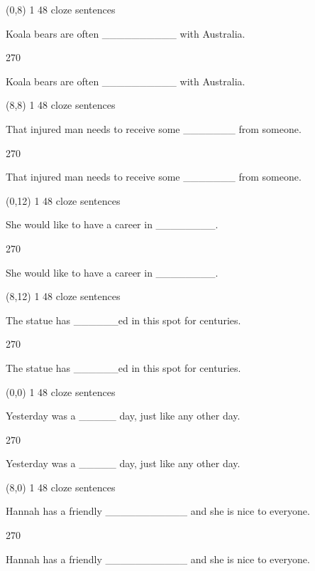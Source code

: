 \documentclass[a4paper]{article}
\newenvironment{itemize*}%
{\begin{itemize}%
 \setlength{\itemsep}{0.5cm}%
 \setlength{\parsep}{0pt}%
 \setlength{\parskip}{0pt}}%
{\end{itemize}}
\newcommand{\mycard}[3]{%
	\small #1 #2
	\par
	\parbox[t][6.8cm][c]{9.5cm}{%
	\par
	\myleft{#3}
	\par
	\myright{#3}
	}
}
\newcommand{\myleft}[1]{%
	\begin{sideways}
	\hspace*{-0.9cm}
		\parbox[t][2.7cm][t]{6.5cm}{%
		\large #1
		}
	\end{sideways}
}
\newcommand{\myright}[1]{%
	\hspace*{6.5cm}
	\begin{turn}{270}
	\hspace*{-7.1cm}
		\parbox[t][2.7cm][t]{6.5cm}{%
		\large #1
		}
	\end{turn}
}
\begin{document}
\begin{textblock}{8}(0,8)
\mycard{1}{48 cloze sentences}{
\begin{itemize*}
\item Koala bears are often \_\_\_\_\_\_\_\_\_\_ with Australia.
\end{itemize*}
}
\end{textblock}

\begin{textblock}{8}(8,8)
\mycard{1}{48 cloze sentences}{
\begin{itemize*}
\item That injured man needs to receive some \_\_\_\_\_\_\_ from someone.
\end{itemize*}
}
\end{textblock}

\begin{textblock}{8}(0,12)
\mycard{1}{48 cloze sentences}{
\begin{itemize*}
\item She would like to have a career in \_\_\_\_\_\_\_\_.
\end{itemize*}
}
\end{textblock}

\begin{textblock}{8}(8,12)
\mycard{1}{48 cloze sentences}{
\begin{itemize*}
\item The statue has \_\_\_\_\_\_ed in this spot for centuries.
\end{itemize*}
}
\end{textblock}

\null
\newpage

\begin{textblock}{8}(0,0)
\mycard{1}{48 cloze sentences}{
\begin{itemize*}
\item Yesterday was a \_\_\_\_\_ day, just like any other day.
\end{itemize*}
}
\end{textblock}

\begin{textblock}{8}(8,0)
\mycard{1}{48 cloze sentences}{
\begin{itemize*}
\item Hannah has a friendly \_\_\_\_\_\_\_\_\_\_\_ and she is nice to everyone.
\end{itemize*}
}
\end{textblock}
\end{document}

